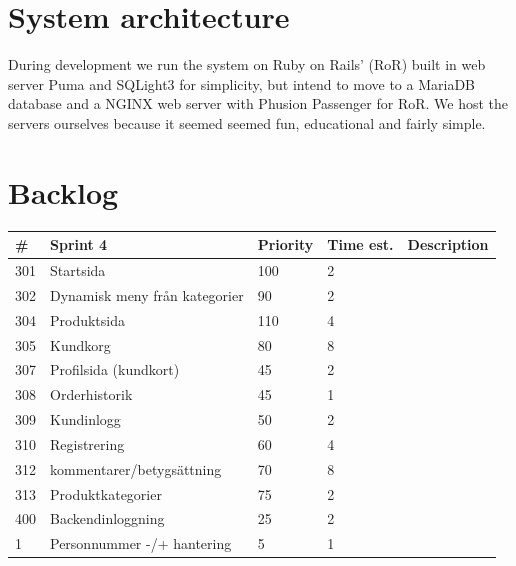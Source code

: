 \documentclass[paper=a4, fontsize=11pt]{report} %
\begin{document}
\begin{itemize}
\section*{System architecture}
	During development we run the system on Ruby on Rails' (RoR) built in web server
	Puma and SQLight3 for simplicity, but intend to move to a MariaDB database
	and a NGINX web server with Phusion Passenger for RoR. We host
	the servers ourselves because it seemed seemed fun, educational and fairly simple.

\section*{Backlog}


	\begin{tabular}{|l|l|l|l|l|}
		\hline
		\#  & Sprint 4                      & Priority & Time est. & Description \\ \hline
		301 & Startsida                     & 100      & 2         &             \\ \hline
		302 & Dynamisk meny från kategorier & 90       & 2         &             \\ \hline
		304 & Produktsida                   & 110      & 4         &             \\ \hline
		305 & Kundkorg                      & 80       & 8         &             \\ \hline
		307 & Profilsida (kundkort)         & 45       & 2         &             \\ \hline
		308 & Orderhistorik                 & 45       & 1         &             \\ \hline
		309 & Kundinlogg                    & 50       & 2         &             \\ \hline
		310 & Registrering                  & 60       & 4         &             \\ \hline
		312 & kommentarer/betygsättning     & 70       & 8         &             \\ \hline
		313 & Produktkategorier             & 75       & 2         &             \\ \hline
		400 & Backendinloggning             & 25       & 2         &             \\ \hline
		1   & Personnummer -/+ hantering    & 5        & 1         &             \\ \hline
	\end{tabular}


\end{itemize}
\end{document}
